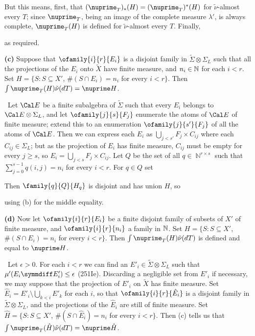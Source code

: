{\noindent But this means, first, that $(\nuprime_T)_*(H)=(\nuprime_T)^*(H)$
for $\tilde\nu$-almost every $T$;  since $\nuprime_T$, being an image of
the complete measure $\lambda'$, is always complete, $\nuprime_T(H)$ is
defined for $\tilde\nu$-almost every $T$.   Finally,


\noindent as required.\ \Qed

\medskip

{\bf (c)} Suppose that $\ofamily{i}{r}{E_i}$ is a disjoint family in
$\tilde\Sigma\otimes\Sigma_L$ such that all the projections of the $E_i$
onto $\tilde X$ have finite measure, and $n_i\in\Bbb N$ for each $i<r$.
Set $H=\{S:S\subseteq X'$,
$\#(S\cap E_i)=n_i$ for every $i<r\}$.
Then $\int\nuprime_T(H)\tilde\nu(dT)=\nuprime H$.

\Prf\ Let $\Cal E$ be a finite subalgebra of $\tilde\Sigma$ such that
every $E_i$ belongs to
$\Cal E\otimes\Sigma_L$, and let $\ofamily{j}{s}{F_j}$ enumerate the
atoms of $\Cal E$ of finite measure;  extend this to an enumeration
$\ofamily{j}{s'}{F_j}$ of all the atoms of $\Cal E$.   Then we can
express each $E_i$ as $\bigcup_{j<s'}F_j\times C_{ij}$ where each
$C_{ij}\in\Sigma_L$;  but as the projection of $E_i$ has finite measure,
$C_{ij}$ must be empty for every $j\ge s$, so
$E_i=\bigcup_{j<s}F_j\times C_{ij}$.   Let $Q$ be the set of all
$q\in\BbbN^{r\times s}$ such that $\sum_{j=0}^{s-1}q(i,j)=n_i$ for every
$i<r$.   For $q\in Q$ set


\noindent Then $\family{q}{Q}{H_q}$ is disjoint and has union $H$, so


\noindent using (b) for the middle equality.\ \Qed

\medskip

{\bf (d)} Now let $\ofamily{i}{r}{E_i}$ be a finite disjoint family of
subsets of $X'$ of finite measure, and $\ofamily{i}{r}{n_i}$ a family in
$\Bbb N$.   Set $H=\{S:S\subseteq X'$, $\#(S\cap E_i)=n_i$ for every
$i<r\}$.   Then $\int\nuprime_T(H)\tilde\nu(dT)$ is defined and equal to
$\nuprime H$.

\Prf\ Let $\epsilon>0$.   For each $i<r$ we can find an
$E'_i\in\tilde\Sigma\otimes\Sigma_L$ such that
$\mu'(E_i\symmdiff E'_i)\le\epsilon$ (251Ie).   Discarding a negligible
set from $E'_i$ if
necessary, we may suppose that the projection of $E'_i$ on $\tilde X$
has finite measure.   Set
$\hat E_i=E'_i\setminus\bigcup_{k<i}E'_k$ for each $i$, so that
$\ofamily{i}{r}{\hat E_i}$ is a disjoint family in
$\tilde\Sigma\otimes\Sigma_L$, and the projections of the $\hat E_i$ are
still of finite measure.   Set
$\hat H=\{S:S\subseteq X'$, $\#(S\cap\hat E_i)=n_i$ for every $i<r\}$.
Then (c) tells us that
$\int\nuprime_T(\hat H)\tilde\nu(dT)=\nuprime\hat H$.

}
